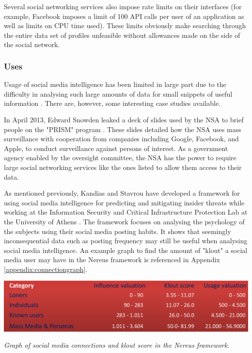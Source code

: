\documentclass[12pt]{article}
\begin{document}
Several social networking services also impose rate limits on their interfaces (for example, Facebook imposes a limit of 100 API calls per user of an application as well as limits on CPU time used). These limits obviously make searching through the entire data set of profiles unfeasible without allowances made on the side of the social network. 

\subsubsection{Uses}
Usage of social media intelligence has been limited in large part due to the difficulty in analysing such large amounts of data for small snippets of useful information \citep{socmintoverview}. There are, however, some interesting case studies available.

In April 2013, Edward Snowden leaked a deck of slides used by the NSA to brief people on the "PRISM" program \citep{prismslides}. These slides detailed how the NSA uses mass surveillance with cooperation from companies including Google, Facebook, and Apple, to conduct surveillance against persons of interest. As a government agency enabled by the oversight committee, the NSA has the power to require large social networking services like the ones listed to allow them access to their data.

As mentioned previously, Kandias and Stavrou have developed a framework for using social media intelligence for predicting and mitigating insider threats while working at the Information Security and Critical Infrastructure Protection Lab at the University of Athens \citep{behaviourdetection}. The framework focuses on analysing the psychology of the subjects using their social media posting habits. It shows that seemingly inconsequential data such as posting frequency may still be useful when analysing social media intelligence. An example graph to find the amount of "klout" a social media user may have in the Nereus framework is referenced in Appendix \ref{appendix:connectiongraph}.

\begin{center}
\includegraphics[width=\linewidth]{res/connection_klout.png}

\textit{Graph of social media connections and klout score in the Nereus framework\citep{behaviourdetection}.}
\end{center}
\end{document}
